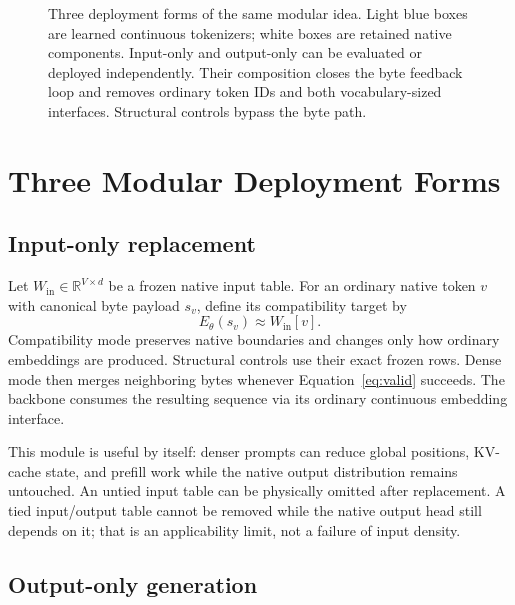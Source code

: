 \documentclass[10pt,twocolumn]{article}
\newcommand{\reals}{\mathbb{R}}
\begin{document}
\begin{figure}[t]
{
}
\caption{Three deployment forms of the same modular idea. Light blue boxes are learned continuous
tokenizers; white boxes are retained native components. Input-only and output-only can be evaluated
or deployed independently. Their composition closes the byte feedback loop and removes ordinary
token IDs and both vocabulary-sized interfaces. Structural controls bypass the byte path.}
\label{fig:architecture}
\end{figure}
\FloatBarrier

\section{Three Modular Deployment Forms}

\subsection{Input-only replacement}

Let $W_{\mathrm{in}}\in\reals^{V\times d}$ be a frozen native input table. For an ordinary native
token $v$ with canonical byte payload $s_v$, define its compatibility target by
\begin{equation}
E_\theta(s_v) \approx W_{\mathrm{in}}[v].
\end{equation}
Compatibility mode preserves native boundaries and changes only how ordinary embeddings are
produced. Structural controls use their exact frozen rows. Dense mode then merges neighboring
bytes whenever Equation~\ref{eq:valid} succeeds. The backbone consumes the resulting sequence via
its ordinary continuous embedding interface.

This module is useful by itself: denser prompts can reduce global positions, KV-cache state, and
prefill work while the native output distribution remains untouched. An untied input table can be
physically omitted after replacement. A tied input/output table cannot be removed while the native
output head still depends on it; that is an applicability limit, not a failure of input density.

\subsection{Output-only generation}
\end{document}
